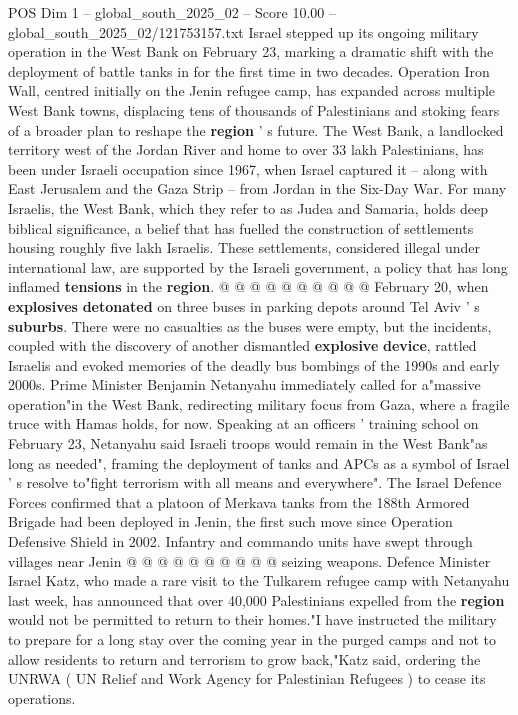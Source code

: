 \begin{textsample}{POS Dim 1 – global\_south\_2025\_02 – Score 10.00 – global\_south\_2025\_02/121753157.txt}  \label{ex:f1_pos_365}
Israel stepped up its ongoing military operation in the West Bank on February 23, marking a dramatic shift with the deployment of battle tanks in for the first time in two decades.
Operation Iron Wall, centred initially on the Jenin refugee camp, has expanded across multiple West Bank towns, displacing tens of thousands of Palestinians and stoking fears of a broader plan to reshape the \textbf{region} ' s future.
The West Bank, a landlocked territory west of the Jordan River and home to over 33 lakh Palestinians, has been under Israeli occupation since 1967, when Israel captured it -- along with East Jerusalem and the Gaza Strip -- from Jordan in the Six-Day War.
For many Israelis, the West Bank, which they refer to as Judea and Samaria, holds deep biblical significance, a belief that has fuelled the construction of settlements housing roughly five lakh Israelis.
These settlements, considered illegal under international law, are supported by the Israeli government, a policy that has long inflamed \textbf{tensions} in the \textbf{region}. @ @ @ @ @ @ @ @ @ @ February 20, when \textbf{explosives} \textbf{detonated} on three buses in parking depots around Tel Aviv ' s \textbf{suburbs}.
There were no casualties as the buses were empty, but the incidents, coupled with the discovery of another dismantled \textbf{explosive} \textbf{device}, rattled Israelis and evoked memories of the deadly bus bombings of the 1990s and early 2000s.
Prime Minister Benjamin Netanyahu immediately called for a"massive operation"in the West Bank, redirecting military focus from Gaza, where a fragile truce with Hamas holds, for now.
Speaking at an officers ' training school on February 23, Netanyahu said Israeli troops would remain in the West Bank"as long as needed", framing the deployment of tanks and APCs as a symbol of Israel ' s resolve to"fight terrorism with all means and everywhere".
The Israel Defence Forces confirmed that a platoon of Merkava tanks from the 188th Armored Brigade had been deployed in Jenin, the first such move since Operation Defensive Shield in 2002.
Infantry and commando units have swept through villages near Jenin @ @ @ @ @ @ @ @ @ @ seizing weapons.
Defence Minister Israel Katz, who made a rare visit to the Tulkarem refugee camp with Netanyahu last week, has announced that over 40,000 Palestinians expelled from the \textbf{region} would not be permitted to return to their homes."I have instructed the military to prepare for a long stay over the coming year in the purged camps and not to allow residents to return and terrorism to grow back,"Katz said, ordering the UNRWA ( UN Relief and Work Agency for Palestinian Refugees ) to cease its operations.

\end{textsample}
